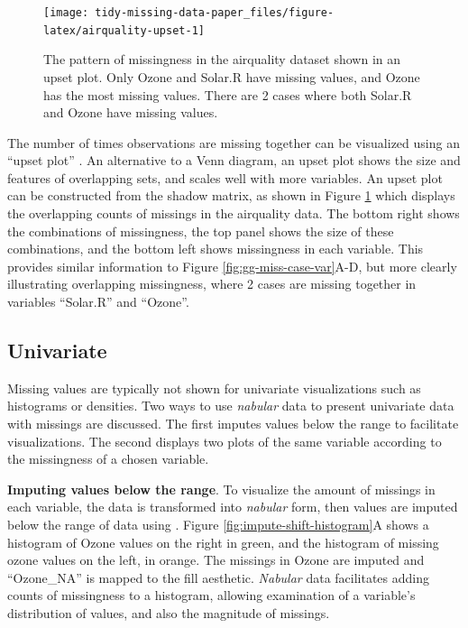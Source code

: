 \documentclass[
]{jss}
\begin{document}
\begin{CodeChunk}
\begin{figure}

{\centering \texttt{[image: tidy-missing-data-paper\_files/figure-latex/airquality-upset-1]} 

}

\caption[The pattern of missingness in the airquality dataset shown in an upset plot]{The pattern of missingness in the airquality dataset shown in an upset plot. Only Ozone and Solar.R have missing values, and Ozone has the most missing values. There are 2 cases where both Solar.R and Ozone have missing values.}\label{fig:airquality-upset}
\end{figure}
\end{CodeChunk}

The number of times observations are missing together can be visualized using an ``upset plot'' \citep{Conway2017}. An alternative to a Venn diagram, an upset plot shows the size and features of overlapping sets, and scales well with more variables. An upset plot can be constructed from the shadow matrix, as shown in Figure \ref{fig:airquality-upset} which displays the overlapping counts of missings in the airquality data. The bottom right shows the combinations of missingness, the top panel shows the size of these combinations, and the bottom left shows missingness in each variable. This provides similar information to Figure \ref{fig:gg-miss-case-var}A-D, but more clearly illustrating overlapping missingness, where 2 cases are missing together in variables ``Solar.R'' and ``Ozone''.

\hypertarget{univariate}{%
\subsection{Univariate}\label{univariate}}

Missing values are typically not shown for univariate visualizations such as histograms or densities. Two ways to use \emph{nabular} data to present univariate data with missings are discussed. The first imputes values below the range to facilitate visualizations. The second displays two plots of the same variable according to the missingness of a chosen variable.

\textbf{Imputing values below the range}. To visualize the amount of missings in each variable, the data is transformed into \emph{nabular} form, then values are imputed below the range of data using . Figure \ref{fig:impute-shift-histogram}A shows a histogram of Ozone values on the right in green, and the histogram of missing ozone values on the left, in orange. The missings in Ozone are imputed and ``Ozone\_NA'' is mapped to the fill aesthetic. \emph{Nabular} data facilitates adding counts of missingness to a histogram, allowing examination of a variable's distribution of values, and also the magnitude of missings.
\end{document}
